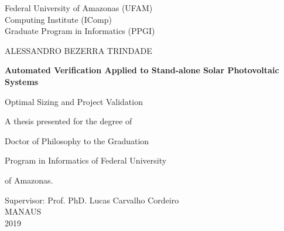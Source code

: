 \begin{titlepage}
    \begin{center}
        \Large
        Federal University of Amazonas (UFAM)\\
        Computing Institute (IComp)\\
		Graduate Program in Informatics (PPGI)\\

        \vspace*{1cm}
        
		\Large
		ALESSANDRO BEZERRA TRINDADE

        \vspace*{2cm}
        		        
        \Huge
        \textbf{Automated Verification Applied to Stand-alone Solar Photovoltaic Systems}
        
        \vspace{0.5cm}
        \LARGE
        Optimal Sizing and Project Validation
        
        \vspace{2cm}
    \end{center}        
    

\hspace{6cm}        A thesis presented for the degree of

\hspace{6cm}        Doctor of Philosophy to the Graduation

\hspace{6cm}        Program in Informatics of Federal University

\hspace{6cm}        of Amazonas.
        
        \vspace{3cm}
        
        \begin{center}
        Supervisor: Prof. PhD. Lucas Carvalho Cordeiro\\
        \vspace{1cm}
        MANAUS\\
        2019\\
        \end{center}
\end{titlepage}